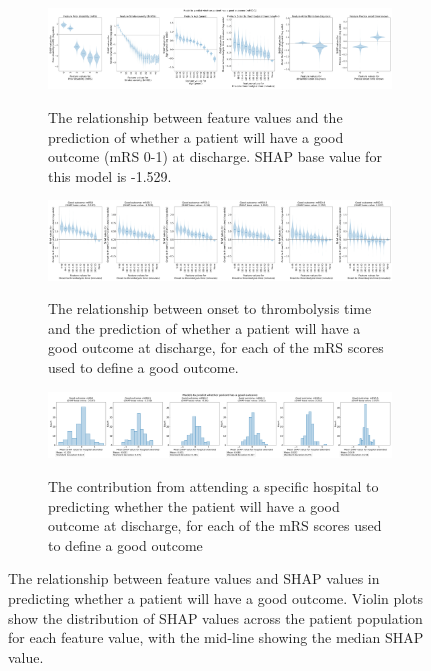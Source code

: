 \begin{figure}
    \centering
    \begin{subfigure}[b]{0.8\textwidth}
      \centering
      \includegraphics[trim={0 0 0 1.2cm}, clip, width=1\textwidth]{./images/083_xgb_7_features_5fold_binary_shap_violin_mrs1_0kfold}\\
      \caption{The relationship between feature values and the prediction of whether a patient will have a good outcome (mRS 0-1) at discharge. SHAP base value for this model is -1.529.}
      \label{fig:global_shap_mrs1}
    \end{subfigure}
    \hfill
    \begin{subfigure}[b]{0.8\textwidth}
      \centering    
      \includegraphics[width=1\textwidth]{./images/083_xgb_7_features_5fold_binary_shap_violin_onset_to_thrombolysis_time_0kfold.jpg}\\
      \caption{The relationship between onset to thrombolysis time and the prediction of whether a patient will have a good outcome at discharge, for each of the mRS scores used to define a good outcome.}
      \label{fig:global_shap_ott}
    \end{subfigure}
    \hfill
    \begin{subfigure}[b]{0.8\textwidth}
      \centering
      \includegraphics[trim={0 0 0 1.2cm}, clip, width=1\textwidth]{./images/083_xgb_7_features_5fold_binary_hosp_shap_hist_mrs_0kfold}\\
      \caption{The contribution from attending a specific hospital to predicting whether the patient will have a good outcome at discharge, for each of the mRS scores used to define a good outcome}
      \label{fig:global_shap_hosp}
    \end{subfigure}
    \label{fig:global_shap}
  \caption{The relationship between feature values and SHAP values in predicting whether a patient will have a good outcome. Violin plots show the distribution of SHAP values across the patient population for each feature value, with the mid-line showing the median SHAP value.} 
\end{figure}


